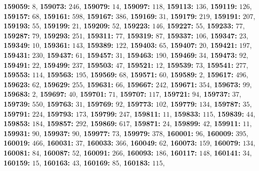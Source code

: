 \textsf{\bfseries 159059:} $8$, \textsf{\bfseries 159073:} $246$, \textsf{\bfseries 159079:} $14$, \textsf{\bfseries 159097:} $118$, \textsf{\bfseries 159113:} $136$, \textsf{\bfseries 159119:} $126$, \textsf{\bfseries 159157:} $68$, \textsf{\bfseries 159161:} $598$, \textsf{\bfseries 159167:} $386$, \textsf{\bfseries 159169:} $31$, \textsf{\bfseries 159179:} $219$, \textsf{\bfseries 159191:} $207$, \textsf{\bfseries 159193:} $55$, \textsf{\bfseries 159199:} $21$, \textsf{\bfseries 159209:} $52$, \textsf{\bfseries 159223:} $146$, \textsf{\bfseries 159227:} $55$, \textsf{\bfseries 159233:} $77$, \textsf{\bfseries 159287:} $79$, \textsf{\bfseries 159293:} $251$, \textsf{\bfseries 159311:} $77$, \textsf{\bfseries 159319:} $87$, \textsf{\bfseries 159337:} $106$, \textsf{\bfseries 159347:} $23$, \textsf{\bfseries 159349:} $10$, \textsf{\bfseries 159361:} $143$, \textsf{\bfseries 159389:} $122$, \textsf{\bfseries 159403:} $65$, \textsf{\bfseries 159407:} $20$, \textsf{\bfseries 159421:} $197$, \textsf{\bfseries 159431:} $230$, \textsf{\bfseries 159437:} $61$, \textsf{\bfseries 159457:} $31$, \textsf{\bfseries 159463:} $190$, \textsf{\bfseries 159469:} $34$, \textsf{\bfseries 159473:} $92$, \textsf{\bfseries 159491:} $22$, \textsf{\bfseries 159499:} $237$, \textsf{\bfseries 159503:} $47$, \textsf{\bfseries 159521:} $12$, \textsf{\bfseries 159539:} $73$, \textsf{\bfseries 159541:} $277$, \textsf{\bfseries 159553:} $114$, \textsf{\bfseries 159563:} $195$, \textsf{\bfseries 159569:} $68$, \textsf{\bfseries 159571:} $60$, \textsf{\bfseries 159589:} $2$, \textsf{\bfseries 159617:} $496$, \textsf{\bfseries 159623:} $62$, \textsf{\bfseries 159629:} $255$, \textsf{\bfseries 159631:} $66$, \textsf{\bfseries 159667:} $242$, \textsf{\bfseries 159671:} $354$, \textsf{\bfseries 159673:} $99$, \textsf{\bfseries 159683:} $2$, \textsf{\bfseries 159697:} $40$, \textsf{\bfseries 159701:} $71$, \textsf{\bfseries 159707:} $117$, \textsf{\bfseries 159721:} $94$, \textsf{\bfseries 159737:} $37$, \textsf{\bfseries 159739:} $550$, \textsf{\bfseries 159763:} $31$, \textsf{\bfseries 159769:} $92$, \textsf{\bfseries 159773:} $102$, \textsf{\bfseries 159779:} $134$, \textsf{\bfseries 159787:} $35$, \textsf{\bfseries 159791:} $224$, \textsf{\bfseries 159793:} $173$, \textsf{\bfseries 159799:} $247$, \textsf{\bfseries 159811:} $11$, \textsf{\bfseries 159833:} $115$, \textsf{\bfseries 159839:} $44$, \textsf{\bfseries 159853:} $184$, \textsf{\bfseries 159857:} $292$, \textsf{\bfseries 159869:} $617$, \textsf{\bfseries 159871:} $24$, \textsf{\bfseries 159899:} $42$, \textsf{\bfseries 159911:} $11$, \textsf{\bfseries 159931:} $90$, \textsf{\bfseries 159937:} $90$, \textsf{\bfseries 159977:} $73$, \textsf{\bfseries 159979:} $378$, \textsf{\bfseries 160001:} $96$, \textsf{\bfseries 160009:} $395$, \textsf{\bfseries 160019:} $466$, \textsf{\bfseries 160031:} $37$, \textsf{\bfseries 160033:} $366$, \textsf{\bfseries 160049:} $62$, \textsf{\bfseries 160073:} $159$, \textsf{\bfseries 160079:} $134$, \textsf{\bfseries 160081:} $84$, \textsf{\bfseries 160087:} $52$, \textsf{\bfseries 160091:} $266$, \textsf{\bfseries 160093:} $186$, \textsf{\bfseries 160117:} $148$, \textsf{\bfseries 160141:} $34$, \textsf{\bfseries 160159:} $15$, \textsf{\bfseries 160163:} $43$, \textsf{\bfseries 160169:} $85$, \textsf{\bfseries 160183:} $115$, 
